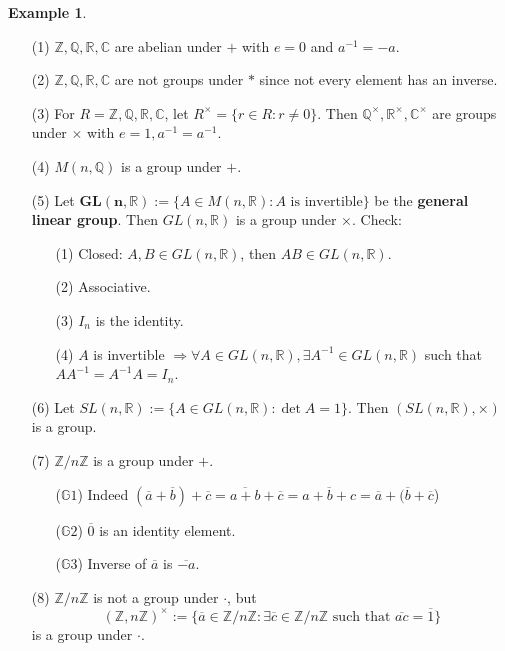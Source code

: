 \documentclass{article}
\theoremstyle{definition}
\newtheorem{ex}{Example}
\newcommand{\CC}{\mathbb C}
\newcommand{\GG}{\mathbb G}
\newcommand{\QQ}{\mathbb Q}
\newcommand{\RR}{\mathbb R}
\newcommand{\ZZ}{\mathbb Z}
\newcommand{\Ra}{\Rightarrow}
\begin{document}
\begin{ex}
	\begin{enumerate}
		\item[(1)] $\ZZ, \QQ, \RR, \CC$ are abelian under $+$ with $e = 0$ and $a^{-1} = -a$.

		\item[(2)] $\ZZ, \QQ, \RR, \CC$ are not groups under $*$ since not every element has an inverse.

		\item[(3)] For $R = \ZZ, \QQ, \RR, \CC$, let $R^\times = \{r \in R: r \neq 0\}$.
			Then $\QQ^\times, \RR^\times, \CC^\times$ are groups under $\times$ with $e = 1, a^{-1} = a^{-1}$.

		\item[(4)] $M(n, \QQ)$ is a group under $+$.

		\item[(5)] Let $\bm{GL(n, \RR)} := \{A \in M(n, \RR): A \text{ is invertible}\}$ be the \textbf{general linear group}.
			Then $GL(n, \RR)$ is a group under $\times$.
			Check:
			\begin{enumerate}
				\item[(1)] Closed: $A, B \in GL(n, \RR)$, then $AB \in GL(n, \RR)$.

				\item[(2)] Associative.

				\item[(3)] $I_n$ is the identity.

				\item[(4)] $A$ is invertible $\Ra \forall A \in GL(n, \RR), \exists A^{-1} \in GL(n, \RR)$ such that $A A^{-1} = A^{-1} A = I_n$.
			\end{enumerate}
			
		\item[(6)] Let $SL(n, \RR) := \{A \in GL(n, \RR): \det A = 1\}$.
			Then $(SL(n, \RR), \times)$ is a group.

		\item[(7)] $\ZZ/n \ZZ$ is a group under $+$.
			\begin{enumerate}
				\item[($\GG 1$)] Indeed $(\overline{a} + \overline{b}) + \overline{c} = \overline{a + b} + \overline{c} = \overline{a + b + c} = \overline{a} + (\overline{b} + \overline{c}$)

				\item[($\GG 2$)] $\overline{0}$ is an identity element.

				\item[($\GG 3$)] Inverse of $\overline{a}$ is $\overline{-a}$.
			\end{enumerate}

		\item[(8)] $\ZZ/n \ZZ$ is not a group under $\cdot$, but 
			\[
				(\ZZ, n \ZZ)^\times := \{\overline{a} \in \ZZ/n \ZZ: \exists \overline{c} \in \ZZ/n \ZZ \text{ such that }\overline{ac} = \overline{1} \}
			\]
			is a group under $\cdot$.
	\end{enumerate}
\end{ex}
\end{document}
